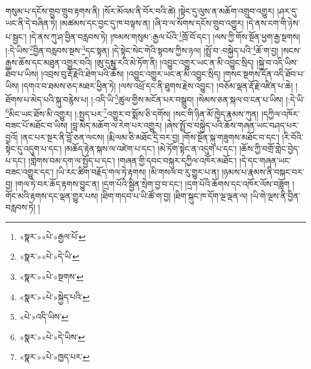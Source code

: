 གསུམ་པ་དངོས་གྲུབ་གྲུབ་རྟགས་ནི། །སོར་མོའམ་ནི་བོར་བའི་ཚེ། །སྟེང་དུ་ལུས་ན་མཆོག་འགྲུབ་འགྱུར། །ཤར་དུ་ཡང་ནི་དེ་བཞིན་ཏེ། །མཚམས་དང་བྱང་དུ་ཁ་བལྟས་ན། །ཞི་བ་ལ་སོགས་དངོས་གྲུབ་འགྱུར། །དེ་ནས་ངག་གི་ཉེས་པ་སྦྱང་། །དེ་ནས་ཀུ་ཤ་བྱིན་བརླབས་ཏེ། །ཁམས་གསུམ་:རྒྱལ་པོའི་\footnote{«སྣར་»«པེ་»རྒྱལ་པོ་}ཁྲོ་བོ་དང་། །ལས་ཀྱི་གོས་སྔོན་ཕྱག་རྒྱ་སྔགས། །:དེ་ཡིས་\footnote{«སྣར་»«པེ་»དེ་ཡི་}བྱིན་བརླབས་སྔས་\footnote{«སྣར་»«པེ་»སྔགས་}དང་སྟན། །དེ་སྟེང་སེང་གེའི་སྟབས་ཀྱིས་ཉལ། །སྤྲོ་བ་:བསྐྱེད་པའི་\footnote{«སྣར་»«པེ་»སྐྱེད་པའི་}ཆོ་ག་བྱ། །སངས་རྒྱས་ཆོས་དང་མཐུན་འགྱུར་བའི། །ཨུ་དུམྦཱ་རའི་མེ་ཏོག་ནི། །འབྱུང་འགྱུར་ཡང་ན་མི་འབྱུང་སྲིད། །སྐྱེ་བ་འདི་ཡིས་ཐོབ་པ་ཡིས། །འབྲས་བུ་རྡོ་རྗེའི་ཐེག་པའི་ཆོས། །འབྱུང་འགྱུར་ཡང་ན་མི་འབྱུང་སྲིད། །གསང་སྔགས་དོན་འདི་ཐོབ་པ་ཡིས། །དགའ་བ་ཐམས་ཅད་མཐར་ཕྱིན་ཏེ། །ལས་འཕྲོ་དང་ནི་ཐུགས་རྗེས་འབྱུང་། །བཅོམ་ལྡན་རྡོ་རྗེ་འཛིན་པ་ཆེ། །ཐོགས་པ་མེད་པའི་སྐུ་བརྙེས་པ། །:འདི་ཡི་\footnote{«པེ་»འདི་ཡིས་}ཚུལ་གྱིས་མངོན་པར་བསྒྲུབ། །སེམས་ཅན་སྐལ་བ་ངན་པ་ཡིས། །:དེ་ཡི་\footnote{«སྣར་»«པེ་»དེ་ཡིས་}མིང་ཡང་ཐོས་མི་འགྱུར། །:སྤྱད་པར་\footnote{«སྣར་»«པེ་»ཁྱད་པར་}འགྱུར་བ་སྨོས་ཅི་དགོས། །སང་གི་ཉིན་མོ་ཁྱེད་རྣམས་ཀུན། །དཀྱིལ་འཁོར་བཟང་པོ་མཐོང་བ་ཡིས། །བླ་མེད་མཆོག་ལ་རེག་པར་འགྱུར། །ཞེས་སྤྲོ་བ་བསྐྱེད་པའི་ཆོས་གཞན་ཡང་བཤད་པར་བྱའོ། །ནང་པར་སྔར་ནི་བློ་ཅན་ལངས། །རྨི་ལམ་ཅི་མཐོང་དྲི་བར་བྱ། །གོས་སྔོན་སྐུ་གཟུགས་མཐོང་བ་དང་། །རི་བོའི་སྟེང་དུ་འདུག་པ་དང་། །མཆོད་རྟེན་སྐས་ལ་འཛེག་པ་དང་། །མེ་ཏོག་སྟེང་ན་འདུག་པ་དང་། །ཆོས་ཀྱི་བགྲོ་གླེང་བྱེད་པ་དང་། །གླེགས་བམ་དག་ལ་སྤྱོད་པ་དང་། །གཞན་གྱི་དབང་བསྐུར་དཀྱིལ་འཁོར་མཐོང་། །དེ་དང་གཞན་ཡང་བཟང་འགྱུར་དང་། །ཡི་རང་ཚིག་བརྗོད་གལ་ཏེ་རྟགས། །མི་གསལ་བ་རུ་གྱུར་པ་ན། །ཉམས་པ་རྣམས་ནི་བསྐང་བར་བྱ། །གལ་ཏེ་བར་ཆོད་རྟགས་བྱུང་ན། །དྲག་པོའི་སྦྱིན་སྲེག་བྱ་བ་དང་། །དྲག་པོའི་ཆོགས་དང་འཁོར་ལོས་བཟློག །གོང་མའི་རྟགས་དང་ལྡན་གྱུར་པས། །ཐིག་གདབ་པ་ཡི་ཚོ་ག་བྱ། །ཐིག་སྐུང་ཁ་དོག་ལྔ་ལྡན་ལ། །ཡི་གེ་ལྔས་ནི་བྱིན་བརླབས་ཏེ། །
